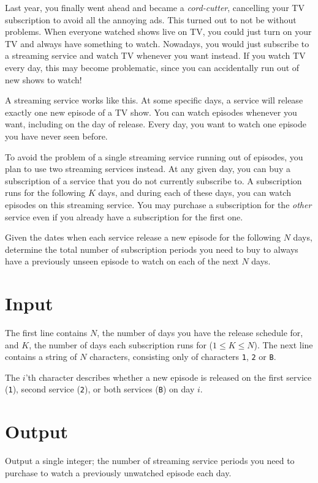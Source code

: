 Last year, you finally went ahead and became a \emph{cord-cutter}, cancelling your TV subscription to avoid all the annoying ads.
This turned out to not be without problems.
When everyone watched shows live on TV, you could just turn on your TV and always have something to watch.
Nowadays, you would just subscribe to a streaming service and watch TV whenever you want instead.
If you watch TV every day, this may become problematic, since you can accidentally run out of new shows to watch!

A streaming service works like this.
At some specific days, a service will release exactly one new episode of a TV show.
You can watch episodes whenever you want, including on the day of release.
Every day, you want to watch one episode you have never seen before.

To avoid the problem of a single streaming service running out of episodes, you plan to use two streaming services instead.
At any given day, you can buy a subscription of a service that you do not currently subscribe to.
A subscription runs for the following $K$ days, and during each of these days, you can watch episodes on this streaming service.
You may purchase a subscription for the \emph{other} service even if you already have a subscription for the first one.

Given the dates when each service release a new episode for the following $N$ days, determine the total number of subscription periods you need to buy to always have a previously unseen episode to watch on each of the next $N$ days.

\section*{Input}
The first line contains $N$, the number of days you have the release schedule for, and $K$, the number of days each subscription runs for ($1 \le K \le N$).
The next line contains a string of $N$ characters, consisting only of characters \texttt{1}, \texttt{2} or \texttt{B}.

The $i$'th character describes whether a new episode is released on the first service (\texttt{1}), second service (\texttt{2}), or both services (\texttt{B}) on day $i$.

\section*{Output}
Output a single integer; the number of streaming service periods you need to purchase to watch a previously unwatched episode each day.

